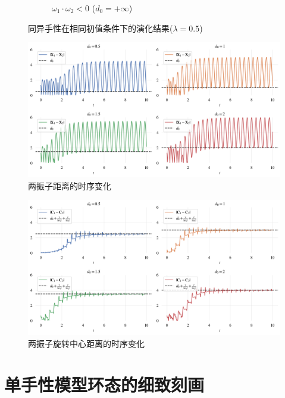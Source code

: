 \documentclass{article}
\begin{document}
\begin{figure}[H]
\begin{subfigure}[b]{0.49\textwidth}
		\vspace{-1cm}
		\caption{$\omega_1 \cdot \omega_2 < 0$ ($d_0=+\infty$)}
	\end{subfigure}
	\caption{同异手性在相同初值条件下的演化结果($\lambda=0.5$)}
	\label{fig:fig2.6.chir}
\end{figure}

\newpage

\begin{figure}[H]
	\centering
	\includegraphics[width=\textwidth]{./figs/2particalDis.png}
	\vspace{-0.5cm}
	\caption{两振子距离的时序变化}
	\label{fig:fig2.6.dis}
\end{figure}

\begin{figure}[H]
	\centering
	\includegraphics[width=\textwidth]{./figs/2particalCentersDis.png}
	\vspace{-0.5cm}
	\caption{两振子旋转中心距离的时序变化}
	\label{fig:fig2.6.centerDis}
\end{figure}

\newpage
\section{单手性模型环态的细致刻画}
\end{document}
